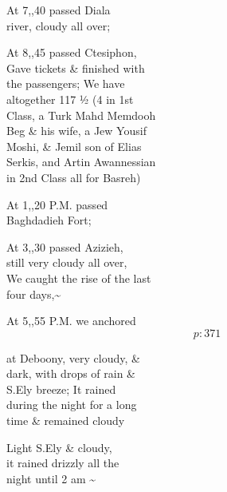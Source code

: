 \documentclass{report}
\begin{document}
	\par{
 	At 7,,40 passed Diala\ \\river, cloudy all over;\ \\
	}

	\par{
 	At 8,,45 passed Ctesiphon,\ \\Gave tickets \& finished with\ \\the passengers; We have\ \\altogether 117 ½ (4 in 1st\ \\Class, a Turk Mahd Memdooh\ \\Beg \& his wife, a Jew Yousif\ \\Moshi, \& Jemil son of Elias\ \\Serkis, and Artin Awannessian\ \\in 2nd Class all for Basreh)\ \\
	}

	\par{
 	At 1,,20 P.M. passed\ \\Baghdadieh Fort;\ \\
	}

	\par{
 	At 3,,30 passed Azizieh,\ \\still very cloudy all over,\ \\We caught the rise of the last\ \\four days,\~{}\ \\
	}

	\par{
 	At 5,,55 P.M. we anchored\ \\
  \[p: 371 \]

	}




	\par{
 	at Deboony, very cloudy, \&\ \\dark, with drops of rain \&\ \\S.Ely breeze; It rained\ \\during the night for a long\ \\time \& remained cloudy\ \\
	}

	\par{
 	Light S.Ely \& cloudy,\ \\it rained drizzly all the\ \\night until 2 am \~{}\ \\
	}
\end{document}
